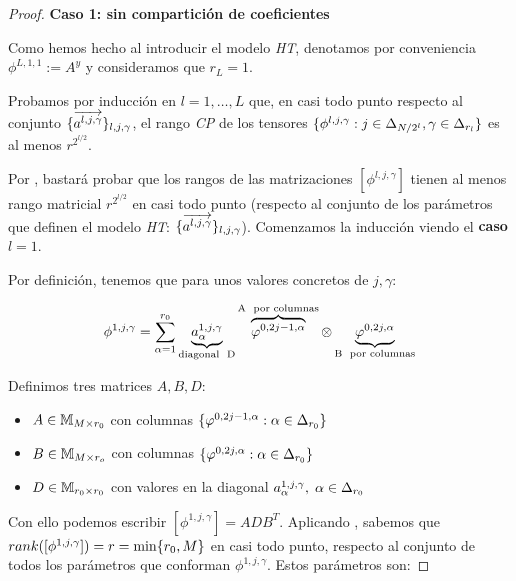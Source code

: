 \begin{proof}
    \textbf{Caso 1: sin compartición de coeficientes}

    Como hemos hecho al introducir el modelo \textit{HT}, denotamos por conveniencia $\phi^{L, 1, 1}:= A^y$ y consideramos que $r_L = 1$.

    Probamos por inducción en $l = 1, \ldots, L$ que, en casi todo punto respecto al conjunto $\{ \overrightarrow{a^{l, j, \gamma}} \}_{l, j, \gamma}$, el rango \textit{CP} de los tensores $\{ \phi^{l, j, \gamma}: j \in \Delta_{N/2^l}, \gamma \in \Delta_{r_l} \}$ es al menos $r^{2^{l/2}}$.

    Por , bastará probar que los rangos de las matrizaciones $[\phi^{l, j, \gamma}]$ tienen al menos rango matricial $r^{2^{l/2}}$ en casi todo punto (respecto al conjunto de los parámetros que definen el modelo \textit{HT}: $\{  \overrightarrow{a^{l, j, \gamma}} \}_{l, j, \gamma}$). Comenzamos la inducción viendo el \textbf{caso $l = 1$}.

    Por definición, tenemos que para unos valores concretos de $j, \gamma$:

    \begin{equation}
        \phi^{1, j, \gamma} = \sum_{\alpha = 1}^{r_0} \underbrace{a_{\alpha}^{1, j, \gamma}}_\textrm{\text{diagonal } D} \overbrace{\varphi^{0, 2j - 1, \alpha}}^\textrm{A \text{ por columnas}} \otimes \underbrace{\varphi^{0, 2j, \alpha}}_\textrm{B \text{ por columnas}}
    \end{equation}

    Definimos tres matrices $A, B, D$:

    \begin{itemize}
        \item $A \in \mathbb{M}_{M \times r_0}$ con columnas $\{ \varphi^{0, 2j - 1, \alpha}: \alpha \in \Delta_{r_0} \}$
        \item $B \in \mathbb{M}_{M \times r_o}$ con columnas $\{ \varphi^{0, 2j, \alpha}: \alpha \in \Delta_{r_0} \}$
        \item $D \in \mathbb{M}_{r_0 \times r_0}$ con valores en la diagonal $a_{\alpha}^{1, j, \gamma}, \; \alpha \in \Delta_{r_0}$
    \end{itemize}

    Con ello podemos escribir $[\phi^{1, j, \gamma}] = A D B^T$. Aplicando , sabemos que $rank([\phi^{1, j, \gamma}]) = r = \min \{ r_0, M \}$ en casi todo punto, respecto al conjunto de todos los parámetros que conforman $\phi^{1, j, \gamma}$. Estos parámetros son:


\end{proof}
